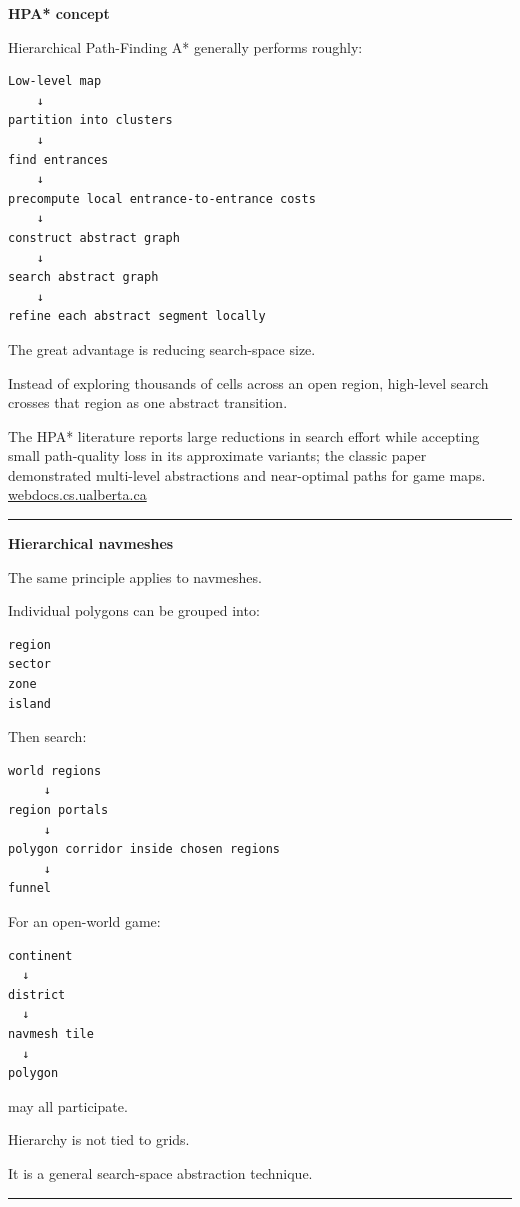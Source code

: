 \textbf{HPA* concept}

Hierarchical Path-Finding A* generally performs roughly:

\begin{verbatim}
Low-level map
    ↓
partition into clusters
    ↓
find entrances
    ↓
precompute local entrance-to-entrance costs
    ↓
construct abstract graph
    ↓
search abstract graph
    ↓
refine each abstract segment locally
\end{verbatim}

The great advantage is reducing search-space size.

Instead of exploring thousands of cells across an open region, high-level search crosses that region as one abstract transition.

The HPA* literature reports large reductions in search effort while accepting small path-quality loss in its approximate variants; the classic paper demonstrated multi-level abstractions and near-optimal paths for game maps. \href{https://webdocs.cs.ualberta.ca/~mmueller/ps/2004/hpastar.pdf?utm_source=chatgpt.com}{webdocs.cs.ualberta.ca}

\begin{center}\rule{0.5\linewidth}{0.5pt}\end{center}

\textbf{Hierarchical navmeshes}

The same principle applies to navmeshes.

Individual polygons can be grouped into:

\begin{verbatim}
region
sector
zone
island
\end{verbatim}

Then search:

\begin{verbatim}
world regions
     ↓
region portals
     ↓
polygon corridor inside chosen regions
     ↓
funnel
\end{verbatim}

For an open-world game:

\begin{verbatim}
continent
  ↓
district
  ↓
navmesh tile
  ↓
polygon
\end{verbatim}

may all participate.

Hierarchy is not tied to grids.

It is a general search-space abstraction technique.

\begin{center}\rule{0.5\linewidth}{0.5pt}\end{center}

